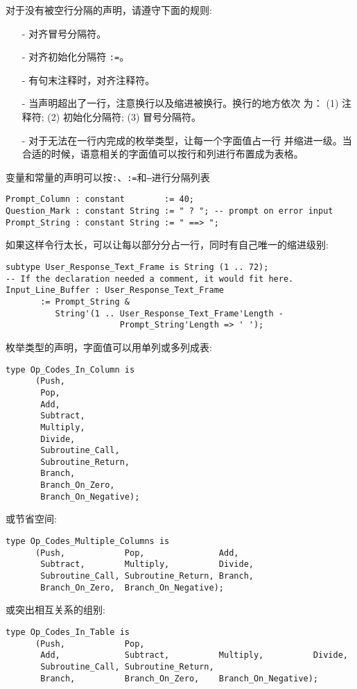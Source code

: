 \begin{blockindent}
对于没有被空行分隔的声明，请遵守下面的规则:
    \begin{itemize}
	\item[-] 对齐冒号分隔符。
	\item[-] 对齐初始化分隔符 \texttt{:=}。
	\item[-] 有句末注释时，对齐注释符。
	\item[-] 当声明超出了一行，注意换行以及缩进被换行。换行的地方依次
为： (1) 注释符; (2) 初始化分隔符; (3) 冒号分隔符。
	\item[-] 对于无法在一行内完成的枚举类型，让每一个字面值占一行
并缩进一级。当合适的时候，语意相关的字面值可以按行和列进行布置成为表格。
    \end{itemize}
\end{blockindent}

\begin{blockindent}
变量和常量的声明可以按\texttt{:}、\texttt{:=}和\texttt{--}进行分隔列表\\
\begin{lstlisting}
Prompt_Column : constant        := 40;
Question_Mark : constant String := " ? "; -- prompt on error input
Prompt_String : constant String := " ==> ";
\end{lstlisting}
如果这样令行太长，可以让每以部分分占一行，同时有自己唯一的缩进级别:
\begin{verbatim}
subtype User_Response_Text_Frame is String (1 .. 72);
-- If the declaration needed a comment, it would fit here.
Input_Line_Buffer : User_Response_Text_Frame
       := Prompt_String &
          String'(1 .. User_Response_Text_Frame'Length -
                       Prompt_String'Length => ' ');
\end{verbatim}
枚举类型的声明，字面值可以用单列或多列成表:
\begin{lstlisting}
type Op_Codes_In_Column is
      (Push,
       Pop,
       Add,
       Subtract,
       Multiply,
       Divide,
       Subroutine_Call,
       Subroutine_Return,
       Branch,
       Branch_On_Zero,
       Branch_On_Negative);
\end{lstlisting}
或节省空间:
\begin{lstlisting}
type Op_Codes_Multiple_Columns is
      (Push,            Pop,               Add,
       Subtract,        Multiply,          Divide,
       Subroutine_Call, Subroutine_Return, Branch,
       Branch_On_Zero,  Branch_On_Negative);
\end{lstlisting}
或突出相互关系的组别:
\begin{lstlisting}
type Op_Codes_In_Table is
      (Push,            Pop,
       Add,             Subtract,          Multiply,          Divide,
       Subroutine_Call, Subroutine_Return,
       Branch,          Branch_On_Zero,    Branch_On_Negative);
\end{lstlisting}
\end{blockindent}

